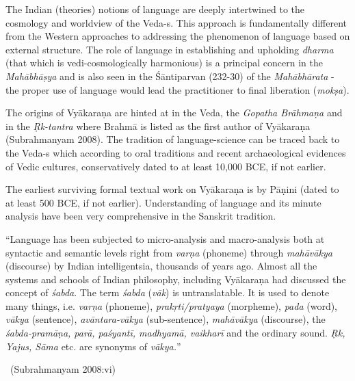 The Indian (theories) notions of language are deeply intertwined to the cosmology and worldview of the Veda-s. This approach is fundamentally different from the Western approaches to addressing the phenomenon of language based on external structure. The role of language in establishing and upholding \textit{dharma} (that which is vedi-cosmologically harmonious) is a principal concern in the \textit{Mahābhāṣya} and is also seen in the Śāntiparvan (232-30) of the \textit{Mahābhārata} - the proper use of language would lead the practitioner to final liberation (\textit{mokṣa}).

The origins of Vyākaraṇa are hinted at in the Veda, the \textit{Gopatha Brāhmaṇa} and in the \textit{Ṛk-tantra} where Brahmā is listed as the first author of Vyākaraṇa (Subrahmanyam 2008). The tradition of language-science can be traced back to the Veda-s which according to oral traditions and recent archaeological evidences of Vedic cultures, conservatively dated to at least 10,000 BCE, if not earlier.

The earliest surviving formal textual work on Vyākaraṇa is by Pāṇini (dated to at least 500 BCE, if not earlier). Understanding of language and its minute analysis have been very comprehensive in the Sanskrit tradition.

\begin{myquote}
“Language has been subjected to micro-analysis and macro-analysis both at syntactic and semantic levels right from \textit{varṇa} (phoneme) through \textit{mahāvākya} (discourse) by Indian intelligentsia, thousands of years ago. Almost all the systems and schools of Indian philosophy, including Vyākaraṇa had discussed the concept of \textit{śabda}. The term \textit{śabda} (\textit{vāk}) is untranslatable. It is used to denote many things, i.e. \textit{varṇa} (phoneme), \textit{prakṛti/pratyaya} (morpheme), \textit{pada} (word), \textit{vākya} (sentence), \textit{avāntara-vākya} (sub-sentence), \textit{mahāvākya} (discourse), the \textit{śabda-pramāṇa, parā, paśyantī, madhyamā, vaikharī} and the ordinary sound. \textit{Ṛk, Yajus, Sāma} etc. are synonyms of \textit{vākya.}”

\vskip -3pt

~\hfill (Subrahmanyam 2008:vi)
\end{myquote}

